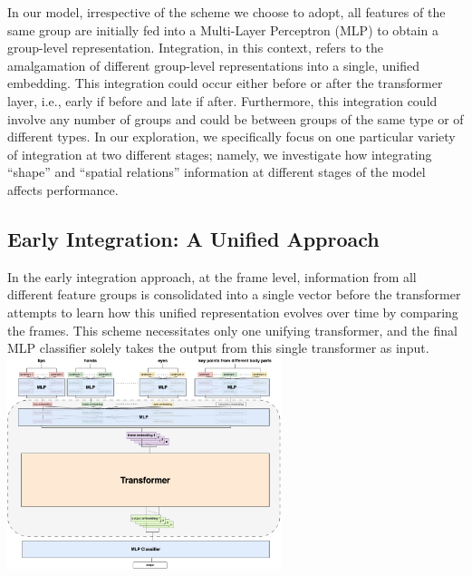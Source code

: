 \documentclass[10pt,twocolumn,letterpaper]{article}
\begin{document}
\begin{CJK*}{UTF8}{bsmi}
In our model, irrespective of the scheme we choose to adopt, all features of the same group are initially fed into a Multi-Layer Perceptron (MLP) to obtain a group-level representation. Integration, in this context, refers to the amalgamation of different group-level representations into a single, unified embedding. This integration could occur either before or after the transformer layer, i.e., early if before and late if after. Furthermore, this integration could involve any number of groups and could be between groups of the same type or of different types. In our exploration, we specifically focus on one particular variety of integration at two different stages; namely, we investigate how integrating “shape” and “spatial relations” information at different stages of the model affects performance.

\subsection{Early Integration: A Unified Approach}
In the early integration approach, at the frame level, information from all different feature groups is consolidated into a single vector before the transformer attempts to learn how this unified representation evolves over time by comparing the frames. This scheme necessitates only one unifying transformer, and the final MLP classifier solely takes the output from this single transformer as input.
\includegraphics[width=80mm]{early_integration.drawio}

\end{CJK*}
\end{document}
